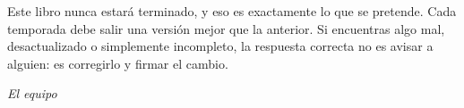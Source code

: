 Este libro nunca estará terminado, y eso es exactamente lo que se pretende. Cada
temporada debe salir una versión mejor que la anterior. Si encuentras algo mal,
desactualizado o simplemente incompleto, la respuesta correcta no es avisar a
alguien: es corregirlo y firmar el cambio.

\vspace{1.5em}
\noindent\hfill\textit{El equipo \FUSAL}
